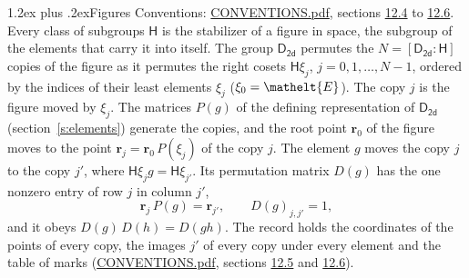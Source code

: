 \documentclass[10pt,a4paper]{article}
\makeatletter
\renewcommand\section{\@startsection{section}{1}{\z@}{-3ex plus -1ex minus -.2ex}%
  {1.2ex plus .2ex}{\normalfont\large\sffamily\bfseries\color{parttitle}}}
\numberwithin{equation}{section}
\newcommand{\eltfont}[1]{{\let\sigma\eltsigma\mathelt{#1}}}
\newcommand{\grp}[1]{\mathsf{#1}}
\newcommand{\cls}[1]{\eltfont{#1}}
\newcommand{\pointr}{\mathbf{r}}
\makeatother
\begin{document}
\section{Figures}\label{s:permutation}
Conventions: \href{../../CONVENTIONS.pdf}{CONVENTIONS.pdf}, sections \href{../../CONVENTIONS.pdf\#conv.12.4}{12.4} to \href{../../CONVENTIONS.pdf\#conv.12.6}{12.6}.
Every class of subgroups $\grp{H}$ is the stabilizer of a figure in space, the subgroup of the elements that carry it into itself. \label{n:local.orbit.size}\label{n:element.coset.least}\label{n:index.coset}The group $\grp{D_{2d}}$ permutes the $N = [\grp{D_{2d}} : \grp{H}]$ copies of the figure as it permutes the right cosets $\grp{H}\xi_j$, $j = 0, 1, \dots, N - 1$, ordered by the indices of their least elements $\xi_j$ ($\xi_0 = \cls{E}$). The copy $j$ is the figure moved by $\xi_j$. The matrices $P(g)$ of the defining representation of $\grp{D_{2d}}$ (section~\ref{s:elements}) generate the copies, and the root point $\pointr_0$ of the figure moves to the point $\pointr_j = \pointr_0\, P(\xi_j)$ of the copy $j$. \label{n:local.coset.image}The element $g$ moves the copy $j$ to the copy $j'$, where $\grp{H}\xi_j g = \grp{H}\xi_{j'}$. \label{n:local.matrix.permutation}Its permutation matrix $D(g)$ has the one nonzero entry of row $j$ in column $j'$,
\begin{equation}\label{e:perm.matrix}\pointr_j\, P(g) = \pointr_{j'}, \qquad D(g)_{j,j'} = 1,\end{equation}
and it obeys $D(g)\, D(h) = D(gh)$. The record holds the coordinates of the points of every copy, the images $j'$ of every copy under every element and the table of marks (\href{../../CONVENTIONS.pdf}{CONVENTIONS.pdf}, sections \href{../../CONVENTIONS.pdf\#conv.12.5}{12.5} and \href{../../CONVENTIONS.pdf\#conv.12.6}{12.6}).
\end{document}

